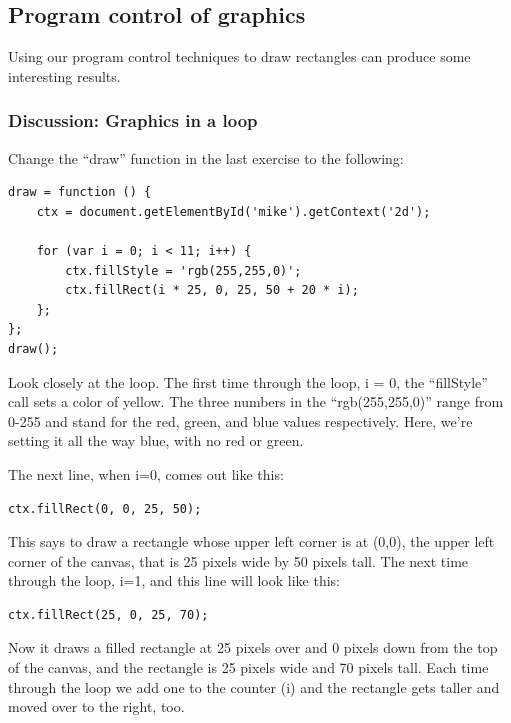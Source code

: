\documentclass[11pt]{article}
\begin{document}
\subsection{Program control of graphics}

Using our program control techniques to draw rectangles can produce
some interesting results.

\subsubsection{Discussion: Graphics in a loop}

Change the ``draw'' function in the last exercise to the following:

\begin{verbatim}
draw = function () {
    ctx = document.getElementById('mike').getContext('2d');

    for (var i = 0; i < 11; i++) {
        ctx.fillStyle = 'rgb(255,255,0)';
        ctx.fillRect(i * 25, 0, 25, 50 + 20 * i);
    };
};
draw();
\end{verbatim}

Look closely at the loop.  The first time through the loop, i = 0, the
``fillStyle'' call sets a color of yellow.  The three numbers in the
``rgb(255,255,0)'' range from 0-255 and stand for the red, green, and
blue values respectively.  Here, we're setting it all the way blue,
with no red or green.

The next line, when i=0, comes out like this:

\begin{verbatim}
ctx.fillRect(0, 0, 25, 50);
\end{verbatim}

This says to draw a rectangle whose upper left corner is at (0,0), the
upper left corner of the canvas, that is 25 pixels wide by 50 pixels
tall.  The next time through the loop, i=1, and this line will look
like this:

\begin{verbatim}
ctx.fillRect(25, 0, 25, 70);
\end{verbatim}

Now it draws a filled rectangle at 25 pixels over and 0 pixels down
from the top of the canvas, and the rectangle is 25 pixels wide and 70
pixels tall.  Each time through the loop we add one to the counter (i)
and the rectangle gets taller and moved over to the right, too.
\end{document}
